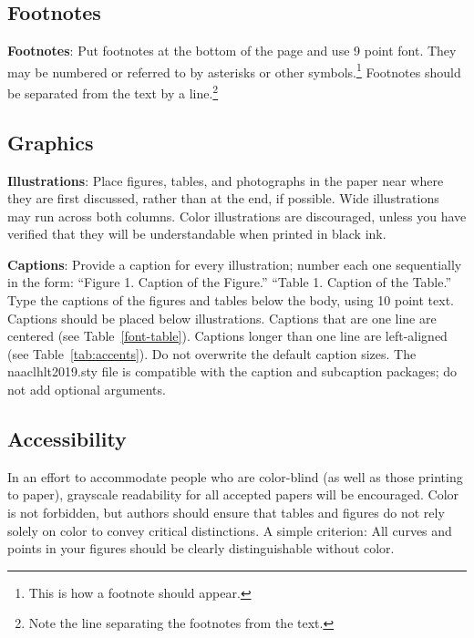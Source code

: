 \documentclass[11pt,a4paper]{article}
\begin{document}
\subsection{Footnotes}

{\bf Footnotes}: Put footnotes at the bottom of the page and use 9
point font. They may be numbered or referred to by asterisks or other
symbols.\footnote{This is how a footnote should appear.} Footnotes
should be separated from the text by a line.\footnote{Note the line
separating the footnotes from the text.}

\subsection{Graphics}

{\bf Illustrations}: Place figures, tables, and photographs in the
paper near where they are first discussed, rather than at the end, if
possible.  Wide illustrations may run across both columns.  Color
illustrations are discouraged, unless you have verified that  
they will be understandable when printed in black ink.

{\bf Captions}: Provide a caption for every illustration; number each one
sequentially in the form:  ``Figure 1. Caption of the Figure.'' ``Table 1.
Caption of the Table.''  Type the captions of the figures and 
tables below the body, using 10 point text. Captions should be placed below illustrations. Captions that are one line are centered (see Table~\ref{font-table}). Captions longer than one line are left-aligned (see Table~\ref{tab:accents}). Do not overwrite the default caption sizes. The naaclhlt2019.sty file is compatible with the caption and subcaption packages; do not add optional arguments.


\subsection{Accessibility}
\label{ssec:accessibility}

In an effort to accommodate people who are color-blind (as well as those printing
to paper), grayscale readability for all accepted papers will be
encouraged.  Color is not forbidden, but authors should ensure that
tables and figures do not rely solely on color to convey critical
distinctions. A simple criterion: All curves and points in your figures should be clearly distinguishable without color.

\end{document}
